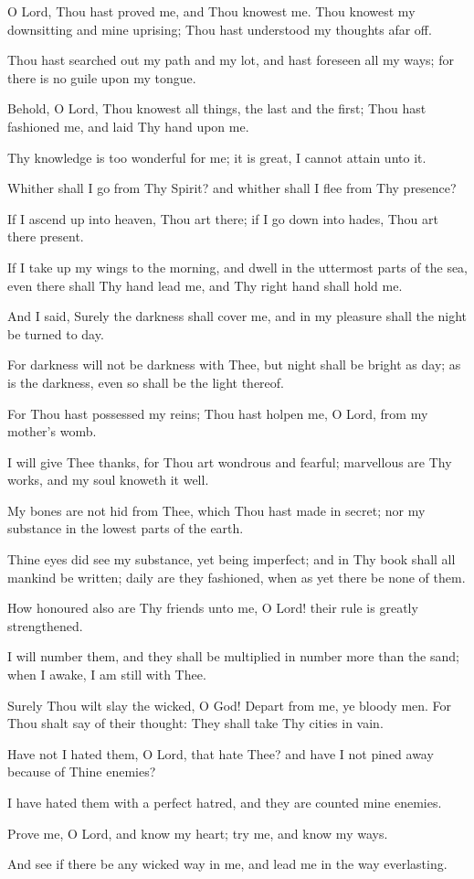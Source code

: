 O Lord, Thou hast proved me, and Thou knowest me. Thou knowest my downsitting and mine uprising; Thou hast understood my thoughts afar off.

Thou hast searched out my path and my lot, and hast foreseen all my ways; for there is no guile upon my tongue.

Behold, O Lord, Thou knowest all things, the last and the first; Thou hast fashioned me, and laid Thy hand upon me.

Thy knowledge is too wonderful for me; it is great, I cannot attain unto it.

Whither shall I go from Thy Spirit? and whither shall I flee from Thy presence?

If I ascend up into heaven, Thou art there; if I go down into hades, Thou art there present.

If I take up my wings to the morning, and dwell in the uttermost parts of the sea, even there shall Thy hand lead me, and Thy right hand shall hold me.

And I said, Surely the darkness shall cover me, and in my pleasure shall the night be turned to day.

For darkness will not be darkness with Thee, but night shall be bright as day; as is the darkness, even so shall be the light thereof.

For Thou hast possessed my reins; Thou hast holpen me, O Lord, from my mother's womb.

I will give Thee thanks, for Thou art wondrous and fearful; marvellous are Thy works, and my soul knoweth it well.

My bones are not hid from Thee, which Thou hast made in secret; nor my substance in the lowest parts of the earth.

Thine eyes did see my substance, yet being imperfect; and in Thy book shall all mankind be written; daily are they fashioned, when as yet there be none of them.

How honoured also are Thy friends unto me, O Lord! their rule is greatly strengthened.

I will number them, and they shall be multiplied in number more than the sand; when I awake, I am still with Thee.

Surely Thou wilt slay the wicked, O God! Depart from me, ye bloody men. For Thou shalt say of their thought: They shall take Thy cities in vain.

Have not I hated them, O Lord, that hate Thee? and have I not pined away because of Thine enemies?

I have hated them with a perfect hatred, and they are counted mine enemies.

Prove me, O Lord, and know my heart; try me, and know my ways.

And see if there be any wicked way in me, and lead me in the way everlasting.
